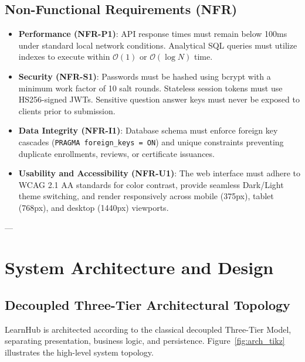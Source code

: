\documentclass[12pt,a4paper]{report}
\begin{document}
\section{Non-Functional Requirements (NFR)}
\begin{itemize}[itemsep=4pt]
    \item \textbf{Performance (NFR-P1)}: API response times must remain below 100ms under standard local network conditions. Analytical SQL queries must utilize indexes to execute within $\mathcal{O}(1)$ or $\mathcal{O}(\log N)$ time.
    \item \textbf{Security (NFR-S1)}: Passwords must be hashed using bcrypt with a minimum work factor of 10 salt rounds. Stateless session tokens must use HS256-signed JWTs. Sensitive question answer keys must never be exposed to clients prior to submission.
    \item \textbf{Data Integrity (NFR-I1)}: Database schema must enforce foreign key cascades (\texttt{PRAGMA foreign\_keys = ON}) and unique constraints preventing duplicate enrollments, reviews, or certificate issuances.
    \item \textbf{Usability and Accessibility (NFR-U1)}: The web interface must adhere to WCAG 2.1 AA standards for color contrast, provide seamless Dark/Light theme switching, and render responsively across mobile (375px), tablet (768px), and desktop (1440px) viewports.
\end{itemize}

---

\chapter{System Architecture and Design}

\section{Decoupled Three-Tier Architectural Topology}
LearnHub is architected according to the classical decoupled Three-Tier Model, separating presentation, business logic, and persistence. Figure~\ref{fig:arch_tikz} illustrates the high-level system topology.
\end{document}
